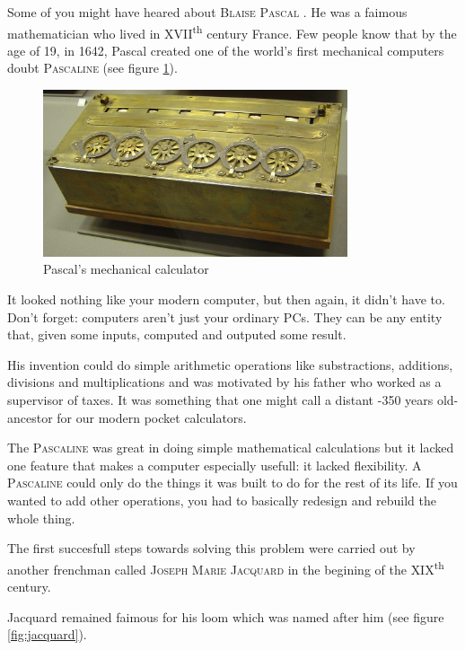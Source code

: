 \documentclass[12pt, a4paper]{book}
\newcommand{\InsertProperName}[1]{
  \textsc{#1}
}
\begin{document}
Some of you might have heared about \InsertProperName{Blaise Pascal}. He was a faimous mathematician who lived in \textsc{XVII}\textsuperscript{th} century France. Few people know that by the age of 19, in 1642, Pascal created one of the world's first mechanical computers doubt \InsertProperName{Pascaline} (see figure  \ref{fig:pascaline}). 

\begin{figure}[h]
  \centering
  \includegraphics[width=0.8\textwidth]{./img/altele/pascaline.jpg}
  \caption{Pascal's mechanical calculator}
  \label{fig:pascaline}
\end{figure}

It looked nothing like your modern computer, but then again, it didn't have to. Don't forget: computers aren't just your ordinary PCs. They can be any entity that, given some inputs, computed and outputed some result.

His invention could do simple arithmetic operations like substractions, additions, divisions and multiplications and was motivated by his father who worked as a supervisor of taxes. It was something that one might call a distant -350 years old- ancestor for our modern pocket calculators.

The \InsertProperName{Pascaline} was great in doing simple mathematical calculations but it lacked one feature that makes a computer especially usefull: it lacked flexibility.   A \InsertProperName{Pascaline} could only do the things it was built to do for the rest of its life. If you wanted to add other operations, you had to basically redesign and rebuild the whole thing.

The first succesfull steps towards solving this problem were carried out by another frenchman called \InsertProperName{Joseph Marie Jacquard} in the begining of the \textsc{XIX}\textsuperscript{th} century. 

Jacquard remained faimous for his loom which was named after him (see figure \ref{fig:jacquard}).
\end{document}

